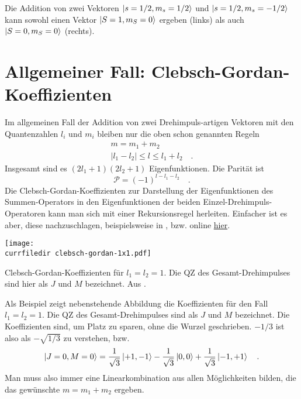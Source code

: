 \begin{marginfigure}

\caption{Die Addition von zwei Vektoren $\ket{s=1/2, m_s = 1/2}$ und  $\ket{s=1/2, m_s = -1/2}$ kann sowohl einen Vektor   $\ket{S=1, m_S = 0}$ ergeben (links) als auch $\ket{S=0, m_S = 0}$ (rechts).}
\end{marginfigure}




\section*{Allgemeiner Fall: Clebsch-Gordan-Koeffizienten}

Im allgemeinen Fall der Addition von zwei Drehimpuls-artigen Vektoren mit den Quantenzahlen $l_i$ und $m_i$ bleiben nur die oben schon genannten Regeln
\begin{align}
   m =  m_1 + m_2 \\
   |l_1 - l_2 | \le l \le l_1 + l_2  \quad .
\end{align}
Insgesamt sind es $(2 l_1 + 1) (2 l_2 +1)$ Eigenfunktionen. Die Parität ist
\begin{equation}
\mathcal{P} = (-1)^{l - l_1 - l_2}  \quad .
\end{equation}
Die Clebsch-Gordan-Koeffizienten zur Darstellung der Eigenfunktionen des Summen-Operators in den Eigenfunktionen der beiden Einzel-Drehimpuls-Operatoren kann man sich mit einer Rekursionsregel herleiten. Einfacher ist es aber, diese nachzuschlagen, beispielsweise in \cite{ParticleDataGroup20}, bzw. online \href{ https://pdg.lbl.gov/2020/reviews/rpp2020-rev-clebsch-gordan-coefs.pdf}{hier}.

\begin{marginfigure}
\texttt{[image: \\currfiledir clebsch-gordan-1x1.pdf]}
\caption{Clebsch-Gordan-Koeffizienten für $l_1 = l_2 = 1$. Die QZ des Gesamt-Drehimpulses sind hier als $J$ und $M$ bezeichnet. Aus \cite{ParticleDataGroup20}.}
\end{marginfigure}

Als Beispiel zeigt nebenstehende Abbildung die Koeffizienten für den Fall $l_1 = l_2 = 1$. Die QZ des Gesamt-Drehimpulses sind  als $J$ und $M$ bezeichnet. Die Koeffizienten sind, um Platz zu sparen, ohne die Wurzel geschrieben. $-1/3$ ist also als $-\sqrt{1/3}$ zu verstehen, bzw.
\begin{equation}
\ket{J = 0, M= 0} = \frac{1}{\sqrt{3}} \ket{+1, -1} - \frac{1}{\sqrt{3}} \ket{0,0} + \frac{1}{\sqrt{3}} \ket{-1, +1}  \quad .
\end{equation}
Man muss also immer eine Linearkombination aus allen Möglichkeiten bilden, die das gewünschte $  m =  m_1 + m_2 $ ergeben.



